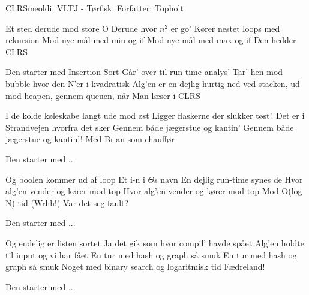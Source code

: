 \begin{sang}{CLRS}{meoldi: VLTJ - Tørfisk. Forfatter: Topholt}
    \begin{vers}
    Et sted derude mod store O
    Derude hvor $n^2$ er go'
    Kører nestet loops med rekursion
    Mod nye mål med min og if
    Mod nye mål med max og if
    Den hedder CLRS
    \end{vers}
    
    \begin{omkvaed}
    Den starter med Insertion Sort
    Går' over til run time analys' 
    Tar' hen mod bubble hvor den N'er i kvadratisk
    Alg'en er en dejlig hurtig ned ved stacken, ud mod heapen, gennem queuen, når
    Man læser i CLRS
    \end{omkvaed}
    
    \begin{vers}
    I de kolde køleskabe langt ude mod øst
    Ligger flaskerne der slukker tøst'.
    Det er i Strandvejen hvorfra det sker
    Gennem både jægerstue og kantin'
    Gennem både jægerstue og kantin'!
    Med Brian som chauffør
    \end{vers}
    
    \begin{omkvaed}
    Den starter med ...
    \end{omkvaed}
    
    \begin{vers}
    Og boolen kommer ud af loop
    Et i-n i $\Theta$s navn
    En dejlig run-time synes de
    Hvor alg'en vender og kører mod top
    Hvor alg'en vender og kører mod top
    Mod O(log N) tid (Wrhh!)
    Var det seg fault?
    \end{vers}
    
    \begin{omkvaed}
    Den starter med ...
    \end{omkvaed}

    \begin{vers}
    Og endelig er listen sortet
    Ja det gik som hvor compil' havde spået
    Alg'en holdte til input og vi har fået
    En tur med hash og graph så smuk
    En tur med hash og graph så smuk
    Noget med binary search og logaritmisk tid
    Fædreland!
    \end{vers}
        
    \begin{omkvaed}
    Den starter med ...
    \end{omkvaed}

    \end{sang}